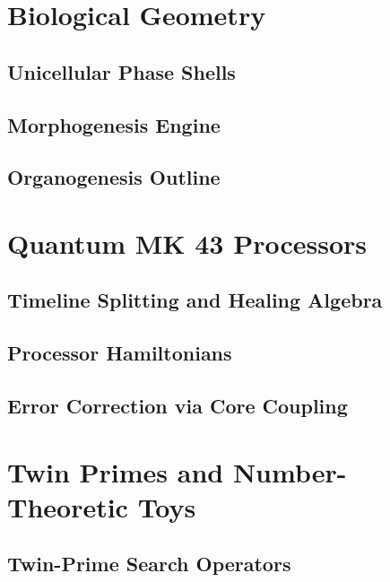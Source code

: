 \section{Biological Geometry}
\label{app:bio-geometry}

\subsection{Unicellular Phase Shells}

\subsection{Morphogenesis Engine}

\subsection{Organogenesis Outline}

\section{Quantum MK 43 Processors}
\label{app:qm-processors}

\subsection{Timeline Splitting and Healing Algebra}

\subsection{Processor Hamiltonians}

\subsection{Error Correction via Core Coupling}

\section{Twin Primes and Number-Theoretic Toys}
\label{app:primes}

\subsection{Twin-Prime Search Operators}

